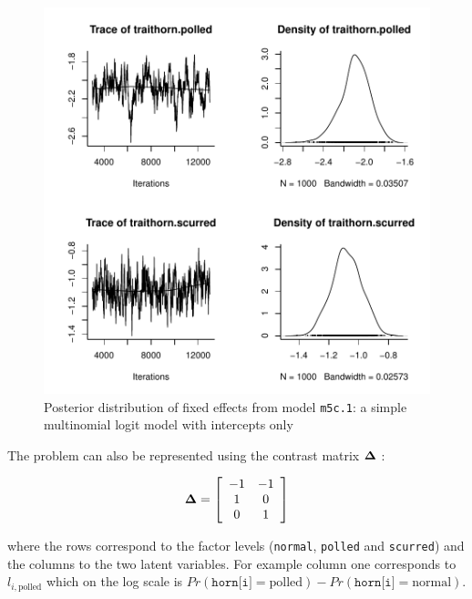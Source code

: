 \documentclass{article}
\begin{document}
\begin{figure}[!h]
\begin{center}
\includegraphics{Lecture5-024}
\end{center}
\caption{Posterior distribution of fixed effects from model \texttt{m5c.1}: a simple multinomial logit model with intercepts only}
\label{MN1}
\end{figure}



The problem can also be represented using the contrast matrix ${\bf \Delta}$ \citep{Bunch.1991}:

\begin{equation}
{\bm \Delta}=
\left[
\begin{array}{c c}
-1&-1\\
1&0\\
0&1\\
\end{array}
\right]
\end{equation}

where the rows correspond to the factor levels (\texttt{normal}, \texttt{polled} and \texttt{scurred}) and the columns to the two latent variables. For example column one corresponds to $l_{i,\textrm{polled}}$ which on the log scale is $Pr(\texttt{horn[i]}=\textrm{polled}) - Pr(\texttt{horn[i]}=\textrm{normal})$.\\
\end{document}
